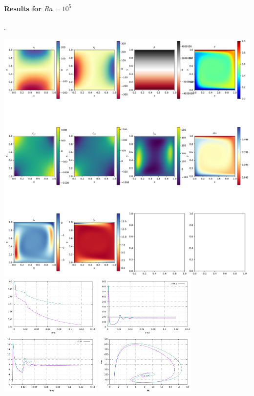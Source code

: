 \newpage
\paragraph{Results for $Ra=10^5$}.
\begin{center}
\includegraphics[width=16cm]{python_codes/fieldstone_03/results_1e5/48x48/solution.pdf}\\
\includegraphics[width=5cm]{python_codes/fieldstone_03/results_1e5/Tavrg.pdf}
\includegraphics[width=5cm]{python_codes/fieldstone_03/results_1e5/vrms.pdf}\\
\includegraphics[width=5cm]{python_codes/fieldstone_03/results_1e5/Nu.pdf}
\includegraphics[width=5cm]{python_codes/fieldstone_03/results_1e5/Nu_vrms.pdf}
\end{center}

